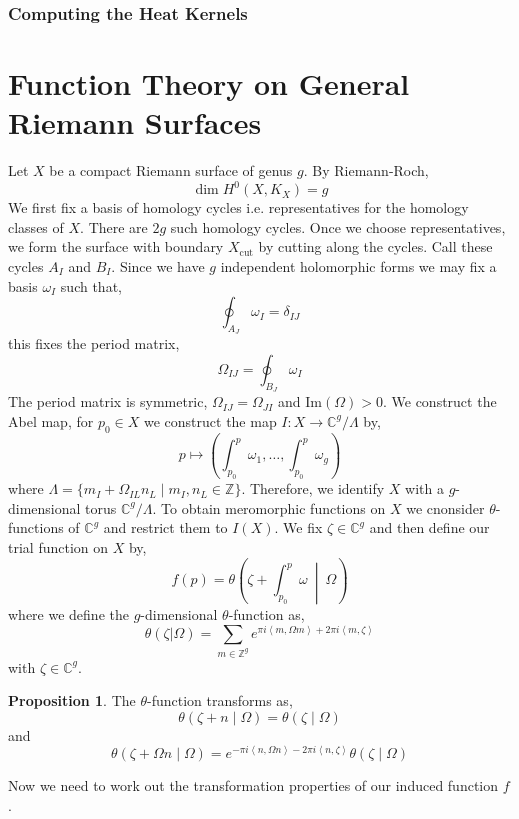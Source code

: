 \documentclass[12pt]{extarticle}
\newcommand{\Z}{\mathbb{Z}}
\newcommand{\C}{\mathbb{C}}
\renewcommand{\Im}[1]{\mathrm{Im}(#1)}
\theoremstyle{definition}
\newtheorem{proposition}[theorem]{Proposition}
\newcommand{\Xcut}{X_{\text{cut}}}
\begin{document}
\subsubsection{Computing the Heat Kernels}

\section{Function Theory on General Riemann Surfaces}

Let $X$ be a compact Riemann surface of genus $g$. By Riemann-Roch,
\[ \dim{H^0(X, K_X)} = g \] 
We first fix a basis of homology cycles i.e. representatives for the homology classes of $X$. There are $2g$ such homology cycles. Once we choose representatives, we form the surface with boundary $\Xcut$ by cutting along the cycles. Call these cycles $A_I$ and $B_I$. Since we have $g$ independent holomorphic forms we may fix a basis $\omega_I$ such that,
\[ \oint_{A_J} \omega_I = \delta_{IJ} \]
this fixes the period matrix,
\[ \Omega_{IJ} = \oint_{B_J} \omega_I \]
The period matrix is symmetric, $\Omega_{IJ} = \Omega_{JI}$ and $\Im{\Omega} > 0$. We construct the Abel map, for $p_0 \in X$ we construct the map $I : X \to \C^g / \Lambda$ by,
\[ p \mapsto \left( \int_{p_0}^p \omega_1, \dots, \int_{p_0}^p \omega_g \right) \]
where $\Lambda = \{ m_I + \Omega_{IL} n_L \mid m_I, n_L \in \Z \}$. Therefore, we identify $X$ with a $g$-dimensional torus $\C^g / \Lambda$. To obtain meromorphic functions on $X$ we cnonsider $\theta$-functions of $\C^g$ and restrict them to $I(X)$. We fix $\zeta \in \C^g$ and then define our trial function on $X$ by,
\[ f(p) = \theta\left( \zeta + \int_{p_0}^p \omega \: \middle| \: \Omega \right) \]
where we define the $g$-dimensional $\theta$-function as,
\[ \theta(\zeta | \Omega) = \sum_{m \in \Z^g}  e^{\pi i \left< m , \Omega m \right> + 2 \pi i \left< m , \zeta \right>} \]
with $\zeta \in \C^g$. 

\begin{proposition}
The $\theta$-function transforms as,
\[ \theta(\zeta + n \mid \Omega) = \theta(\zeta \mid \Omega) \]
and
\[ \theta(\zeta + \Omega n \mid \Omega) = e^{- \pi i \left< n, \Omega n \right> - 2 \pi i \left< n, \zeta \right>} \theta(\zeta \mid \Omega) \]
\end{proposition}
Now we need to work out the transformation properties of our induced function $f$.
\end{document}
